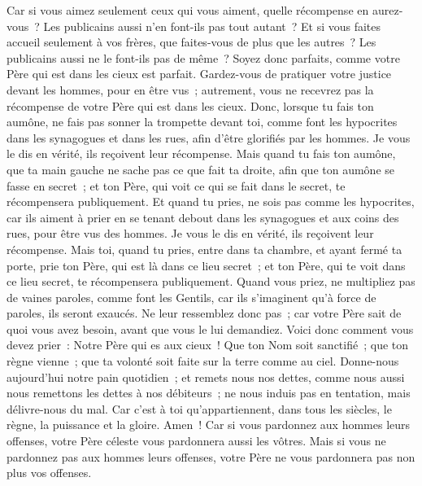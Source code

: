 \begin{multicols}{2}
Car si vous aimez seulement ceux qui vous aiment, quelle récompense en aurez-vous~? Les publicains aussi n'en font-ils pas tout autant~?
Et si vous faites accueil seulement à vos frères, que faites-vous de plus que les autres~? Les publicains aussi ne le font-ils pas de même~?
Soyez donc parfaits, comme votre Père qui est dans les cieux est parfait.
\VerseOne{}Gardez-vous de pratiquer votre justice devant les hommes, pour en être vus~; autrement, vous ne recevrez pas la récompense de votre Père qui est dans les cieux.
Donc, lorsque tu fais ton aumône, ne fais pas sonner la trompette devant toi, comme font les hypocrites dans les synagogues et dans les rues, afin d'être glorifiés par les hommes. Je vous le dis en vérité, ils reçoivent leur récompense.
Mais quand tu fais ton aumône, que ta main gauche ne sache pas ce que fait ta droite,
afin que ton aumône se fasse en secret~; et ton Père, qui voit ce qui se fait dans le secret, te récompensera publiquement.
Et quand tu pries, ne sois pas comme les hypocrites, car ils aiment à prier en se tenant debout dans les synagogues et aux coins des rues, pour être vus des hommes. Je vous le dis en vérité, ils reçoivent leur récompense.
Mais toi, quand tu pries, entre dans ta chambre, et ayant fermé ta porte, prie ton Père, qui est là dans ce lieu secret~; et ton Père, qui te voit dans ce lieu secret, te récompensera publiquement.
Quand vous priez, ne multipliez pas de vaines paroles, comme font les Gentils, car ils s'imaginent qu'à force de paroles, ils seront exaucés.
Ne leur ressemblez donc pas~; car votre Père sait de quoi vous avez besoin, avant que vous le lui demandiez.
Voici donc comment vous devez prier~: Notre Père qui es aux cieux~! Que ton Nom soit sanctifié~;
que ton règne vienne~; que ta volonté soit faite sur la terre comme au ciel.
Donne-nous aujourd'hui notre pain quotidien~;
et remets nous nos dettes, comme nous aussi nous remettons les dettes à nos débiteurs~;
ne nous induis pas en tentation, mais délivre-nous du mal. Car c'est à toi qu'appartiennent, dans tous les siècles, le règne, la puissance et la gloire. Amen~!
Car si vous pardonnez aux hommes leurs offenses, votre Père céleste vous pardonnera aussi les vôtres.
Mais si vous ne pardonnez pas aux hommes leurs offenses, votre Père ne vous pardonnera pas non plus vos offenses.

\end{multicols}
